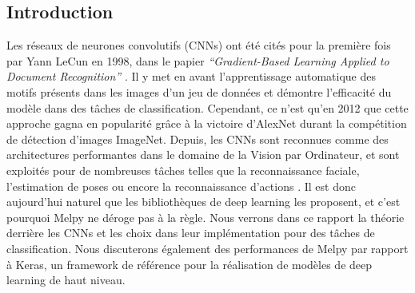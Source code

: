 \begin{multicols}{2}
\tableofcontents
\section{Introduction}
Les réseaux de neurones convolutifs (CNNs) ont été cités pour 
la première fois par Yann LeCun en 1998, dans le papier 
\textit{“Gradient-Based Learning Applied to Document Recognition”} \cite{YannLeCunCNNs}.
Il y met en avant l’apprentissage automatique des motifs présents dans les 
images d’un jeu de données et démontre l’efficacité du modèle dans des tâches
de classification. Cependant, ce n’est qu’en 2012 que cette approche 
gagna en popularité grâce à la victoire d’AlexNet\cite{AlexNet} durant la 
compétition de détection d’images ImageNet. Depuis, les CNNs sont reconnues 
comme des architectures performantes dans le domaine de la Vision par Ordinateur, 
et sont exploités pour de nombreuses tâches telles que la reconnaissance 
faciale, l’estimation de poses ou encore la reconnaissance d’actions 
\cite{ApplicationsOfCNNs}. Il est donc aujourd’hui naturel que les bibliothèques 
de deep learning les proposent, et c’est pourquoi Melpy ne déroge pas à la 
règle. Nous verrons dans ce rapport la théorie derrière les CNNs et les choix 
dans leur implémentation pour des tâches de classification. Nous discuterons 
également des performances de Melpy par rapport à Keras, un framework de 
référence pour la réalisation de modèles de deep learning de haut niveau.
\end{multicols}